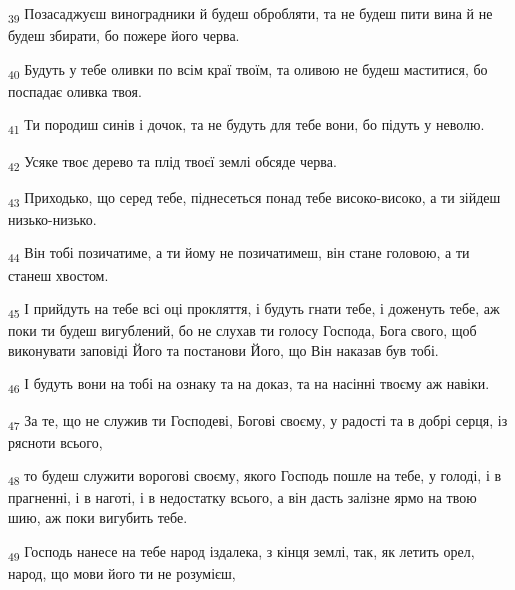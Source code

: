 \begin{tcolorbox}
\textsubscript{39} Позасаджуєш виноградники й будеш обробляти, та не будеш пити вина й не будеш збирати, бо пожере його черва.
\end{tcolorbox}
\begin{tcolorbox}
\textsubscript{40} Будуть у тебе оливки по всім краї твоїм, та оливою не будеш маститися, бо поспадає оливка твоя.
\end{tcolorbox}
\begin{tcolorbox}
\textsubscript{41} Ти породиш синів і дочок, та не будуть для тебе вони, бо підуть у неволю.
\end{tcolorbox}
\begin{tcolorbox}
\textsubscript{42} Усяке твоє дерево та плід твоєї землі обсяде черва.
\end{tcolorbox}
\begin{tcolorbox}
\textsubscript{43} Приходько, що серед тебе, піднесеться понад тебе високо-високо, а ти зійдеш низько-низько.
\end{tcolorbox}
\begin{tcolorbox}
\textsubscript{44} Він тобі позичатиме, а ти йому не позичатимеш, він стане головою, а ти станеш хвостом.
\end{tcolorbox}
\begin{tcolorbox}
\textsubscript{45} І прийдуть на тебе всі оці прокляття, і будуть гнати тебе, і доженуть тебе, аж поки ти будеш вигублений, бо не слухав ти голосу Господа, Бога свого, щоб виконувати заповіді Його та постанови Його, що Він наказав був тобі.
\end{tcolorbox}
\begin{tcolorbox}
\textsubscript{46} І будуть вони на тобі на ознаку та на доказ, та на насінні твоєму аж навіки.
\end{tcolorbox}
\begin{tcolorbox}
\textsubscript{47} За те, що не служив ти Господеві, Богові своєму, у радості та в добрі серця, із рясноти всього,
\end{tcolorbox}
\begin{tcolorbox}
\textsubscript{48} то будеш служити ворогові своєму, якого Господь пошле на тебе, у голоді, і в прагненні, і в наготі, і в недостатку всього, а він дасть залізне ярмо на твою шию, аж поки вигубить тебе.
\end{tcolorbox}
\begin{tcolorbox}
\textsubscript{49} Господь нанесе на тебе народ іздалека, з кінця землі, так, як летить орел, народ, що мови його ти не розумієш,
\end{tcolorbox}
